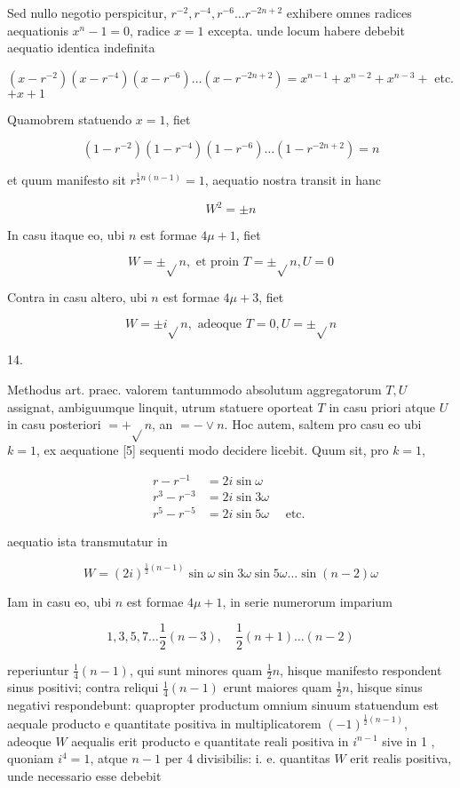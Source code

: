 \documentclass[10pt]{article}
\begin{document}
Sed nullo negotio perspicitur, \(r^{-2}, r^{-4}, r^{-6} \ldots r^{-2 n+2}\) exhibere omnes radices aequationis \(x^{n}-1=0\), radice \(x=1\) excepta. unde locum habere debebit aequatio identica indefinita

\(\left(x-r^{-2}\right)\left(x-r^{-4}\right)\left(x-r^{-6}\right) \ldots\left(x-r^{-2 n+2}\right)=x^{n-1}+x^{n-2}+x^{n-3}+\) etc. \(+x+1\)

Quamobrem statuendo \(x=1\), fiet

\[
\left(1-r^{-2}\right)\left(1-r^{-4}\right)\left(1-r^{-6}\right) \ldots\left(1-r^{-2 n+2}\right)=n
\]

et quum manifesto sit \(r^{\frac{1}{2} n(n-1)}=1\), aequatio nostra transit in hanc

\[
W^{2}= \pm n
\]

In casu itaque eo, ubi \(n\) est formae \(4 \mu+1\), fiet

\[
W= \pm \sqrt{ } n, \text { et proin } T= \pm \sqrt{ } n, U=0
\]

Contra in casu altero, ubi \(n\) est formae \(4 \mu+3\), fiet

\[
W= \pm i \sqrt{ } n, \text { adeoque } T=0, U= \pm \sqrt{ } n
\]

14.

Methodus art. praec. valorem tantummodo absolutum aggregatorum \(T, U\) assignat, ambiguumque linquit, utrum statuere oporteat \(T\) in casu priori atque \(U\) in casu posteriori \(=+\sqrt{ } n\), an \(=-\vee n\). Hoc autem, saltem pro casu eo ubi \(k=1\), ex aequatione [5] sequenti modo decidere licebit. Quum sit, pro \(k=1\),

\[
\begin{aligned}
r-r^{-1} & =2 i \sin \omega \\
r^{3}-r^{-3} & =2 i \sin 3 \omega \\
r^{5}-r^{-5} & =2 i \sin 5 \omega \quad \text { etc. }
\end{aligned}
\]

aequatio ista transmutatur in

\[
W=(2 i)^{\frac{1}{2}(n-1)} \sin \omega \sin 3 \omega \sin 5 \omega \ldots \sin (n-2) \omega
\]

Iam in casu eo, ubi \(n\) est formae \(4 \mu+1\), in serie numerorum imparium

\[
1,3,5,7 \ldots \frac{1}{2}(n-3), \quad \frac{1}{2}(n+1) \ldots(n-2)
\]

reperiuntur \(\frac{1}{4}(n-1)\), qui sunt minores quam \(\frac{1}{2} n\), hisque manifesto respondent sinus positivi; contra reliqui \(\frac{1}{4}(n-1)\) erunt maiores quam \(\frac{1}{2} n\), hisque sinus negativi respondebunt: quapropter productum omnium sinuum statuendum est aequale producto e quantitate positiva in multiplicatorem \((-1)^{\frac{1}{2}(n-1)}\), adeoque \(W\) aequalis erit producto e quantitate reali positiva in \(i^{n-1}\) sive in 1 , quoniam \(i^{4}=1\), atque \(n-1\) per 4 divisibilis: i. e. quantitas \(W\) erit realis positiva, unde necessario esse debebit
\end{document}
